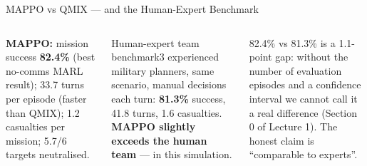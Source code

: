 \documentclass[aspectratio=169,10pt,t]{beamer}
\begin{document}
\begin{frame}{MAPPO vs QMIX --- and the Human-Expert Benchmark}
\begin{columns}[T]
\begin{rbox}\scriptsize\textbf{MAPPO:} mission success \textbf{82.4\%} (best no-comms MARL result); 33.7 turns per episode (faster than QMIX); 1.2 casualties per mission; 5.7/6 targets neutralised.\end{rbox}
\begin{cbox}[ISSAnavy]{Human-expert team benchmark}\scriptsize 3 experienced military planners, same scenario, manual decisions each turn: \textbf{81.3\%} success, 41.8 turns, 1.6 casualties. \textbf{MAPPO slightly exceeds the human team} --- in this simulation.\end{cbox}
\begin{wbox}\scriptsize 82.4\% vs 81.3\% is a 1.1-point gap: without the number of evaluation episodes and a confidence interval we cannot call it a real difference (Section 0 of Lecture 1). The honest claim is ``comparable to experts''.\end{wbox}
\end{columns}
\end{frame}
\end{document}
